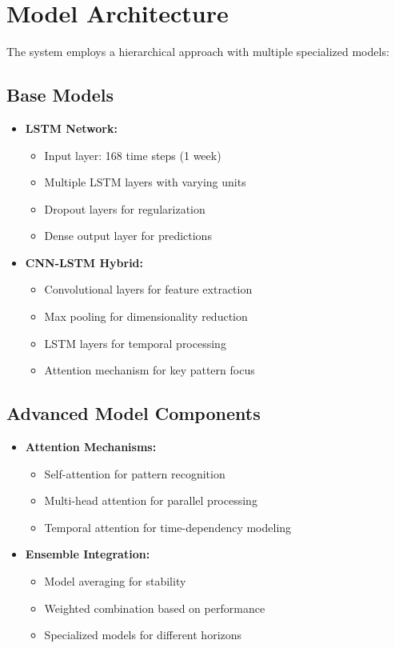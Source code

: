 \documentclass[12pt,a4paper]{report}
\begin{document}
\section{Model Architecture}
The system employs a hierarchical approach with multiple specialized models:

\subsection{Base Models}
\begin{itemize}
\item \textbf{LSTM Network:}
  \begin{itemize}
    \item Input layer: 168 time steps (1 week)
    \item Multiple LSTM layers with varying units
    \item Dropout layers for regularization
    \item Dense output layer for predictions
  \end{itemize}

\item \textbf{CNN-LSTM Hybrid:}
  \begin{itemize}
    \item Convolutional layers for feature extraction
    \item Max pooling for dimensionality reduction
    \item LSTM layers for temporal processing
    \item Attention mechanism for key pattern focus
  \end{itemize}
\end{itemize}

\subsection{Advanced Model Components}
\begin{itemize}
\item \textbf{Attention Mechanisms:}
  \begin{itemize}
    \item Self-attention for pattern recognition
    \item Multi-head attention for parallel processing
    \item Temporal attention for time-dependency modeling
  \end{itemize}

\item \textbf{Ensemble Integration:}
  \begin{itemize}
    \item Model averaging for stability
    \item Weighted combination based on performance
    \item Specialized models for different horizons
  \end{itemize}
\end{itemize}
\end{document}

